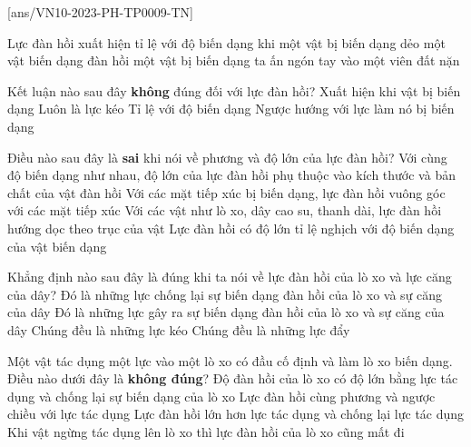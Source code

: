 \let\lesson\undefined
\newcommand{\lesson}{\phantomlesson{Ôn tập chương 9}}
\setcounter{section}{2}
\setcounter{ex}{0}
[ans/VN10-2023-PH-TP0009-TN]
\begin{ex}
Lực đàn hồi xuất hiện tỉ lệ với độ biến dạng khi 	
	\choice
	{một vật bị biến dạng dẻo}
	{\True một vật biến dạng đàn hồi}
	{một vật bị biến dạng}
	{ta ấn ngón tay vào một viên đất nặn}
\end{ex}
\begin{ex}
	Kết luận nào sau đây \textbf{không} đúng đối với lực đàn hồi?
	\choice
	{Xuất hiện khi vật bị biến dạng}
	{\True Luôn là lực kéo}
	{Tỉ lệ với độ biến dạng}
	{Ngược hướng với lực làm nó bị biến dạng}
\end{ex}
\begin{ex}
Điều nào sau đây là \textbf{sai} khi nói về phương và độ lớn của lực đàn hồi?	
	\choice
	{Với cùng độ biến dạng như nhau, độ lớn của lực đàn hồi phụ thuộc vào kích thước và bản chất của vật đàn hồi}
	{Với các mặt tiếp xúc bị biến dạng, lực đàn hồi vuông góc với các mặt tiếp xúc}
	{Với các vật như lò xo, dây cao su, thanh dài, lực đàn hồi hướng dọc theo trục của vật}
	{\True Lực đàn hồi có độ lớn tỉ lệ nghịch với độ biến dạng của vật biến dạng}
\end{ex}
\begin{ex}
	Khẳng định nào sau đây là đúng khi ta nói về lực đàn hồi của lò xo và lực căng của dây?
	\choice
	{\True Đó là những lực chống lại sự biến dạng đàn hồi của lò xo và sự căng của dây}
	{Đó là những lực gây ra sự biến dạng đàn hồi của lò xo và sự căng của dây}
	{Chúng đều là những lực kéo}
	{Chúng đều là những lực đẩy}
\end{ex}
\begin{ex}
	Một vật tác dụng một lực vào một lò xo có đầu cố định và làm lò xo biến dạng. Điều nào dưới đây là \textbf{không đúng}?
	\choice
	{Độ đàn hồi của lò xo có độ lớn bằng lực tác dụng và chống lại sự biến dạng của lò xo}
	{Lực đàn hồi cùng phương và ngược chiều với lực tác dụng}
	{\True Lực đàn hồi lớn hơn lực tác dụng và chống lại lực tác dụng}
	{Khi vật ngừng tác dụng lên lò xo thì lực đàn hồi của lò xo cũng mất đi}
	\loigiai{}
\end{ex}
